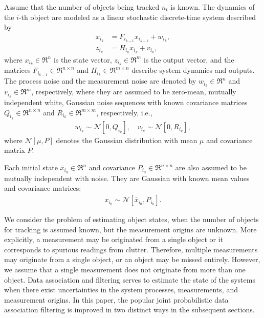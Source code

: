Assume that the number of objects being tracked $n_t$ is known.
The dynamics of the $i$-th object are modeled as a linear stochastic discrete-time system described by
\begin{align}
x_{i_{k}} & = F_{i_{k-1}} x_{i_{k-1}} + w_{i_{k}},\label{eqn:xkp}\\
z_{i_k} & = H_{i_k} x_{i_k} + v_{i_k},\label{eqn:zlin}
\end{align}
where $x_{i_k}\in\Re^n$ is the state vector, $z_{i_k}\in\Re^m$ is the output vector, and  the matrices $F_{i_{k-1}}\in\Re^{n\times n}$ and $H_{i_k}\in\Re^{m\times n}$ describe system dynamics and outputs.
The process noise and the measurement noise are denoted by $w_{i_k}\in\Re^n$ and $v_{i_k}\in\Re^m$, respectively, where they are assumed to be zero-mean, mutually independent white, Gaussian noise sequences with known covariance matrices $Q_{i_k}\in\Re^{n\times n}$ and $R_{i_k}\in\Re^{m\times m}$, respectively, i.e.,
\begin{align}
w_{i_k} \sim \mathcal{N}[0,Q_{i_k}],\quad
v_{i_k} \sim \mathcal{N}[0,R_{i_k}],
\end{align}
where $\mathcal{N}[\mu,P]$ denotes the Gaussian distribution with mean $\mu$ and covariance matrix $P$.

Each initial state $\bar x_{i_0}\in\Re^n$ and covariance $P_{i_0}\in\Re^{n\times n}$ are also assumed to be mutually independent with noise. They are Gaussian with known mean values and covariance matrices:
\begin{align}
x_{i_0} \sim \mathcal{N}[\bar x_{i_0}, P_{i_0}].\label{eqn:xi0}
\end{align}

We consider the problem of estimating object states, when the number of objects for tracking is assumed known, but the measurement origins are unknown. More explicitly, a measurement may be originated from a single object or it corresponds to spurious readings from clutter. Therefore, multiple measurements may originate from a single object, or an object may be missed entirely.
However, we assume that a single measurement does not originate from more than one object.
Data association and filtering serves to estimate the state of the systems when there exist uncertainties in the system processes, measurements, and measurement origins. In this paper, the popular joint probabilistic data association filtering is improved in two distinct ways in the subsequent sections.



